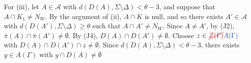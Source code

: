 For (iii), let $A \in \mathcal{A}$ with $d(D(A), \Sigma \setminus \Delta) < \theta - 3$, and suppose that $A \cap K_1 \ne N_W$. By the argument of (ii), $A \cap K$ is null, and so there exists $A' \in \mathcal{A}$ with $d(D(A'), \Sigma \setminus \Delta) \ge \theta$ such that $A \cap A' \ne N_W$. Since $A \ne A'$, by (J2), $\bar{\pi}(A) \cap \bar{\pi}(A') \ne \emptyset$. By (J4), $D(A) \cap D(A') \ne \emptyset$. Choose $z \in \delm{Z(\Gamma)}\fix{A(\Gamma)}$ with $D(A) \cap D(A') \cap z \ne \emptyset$. Since $d(D(A), \Sigma \setminus \Delta) < \theta - 3$, there exists $y \in A(\Gamma)$ with $y \cap D(A) \ne \emptyset$
